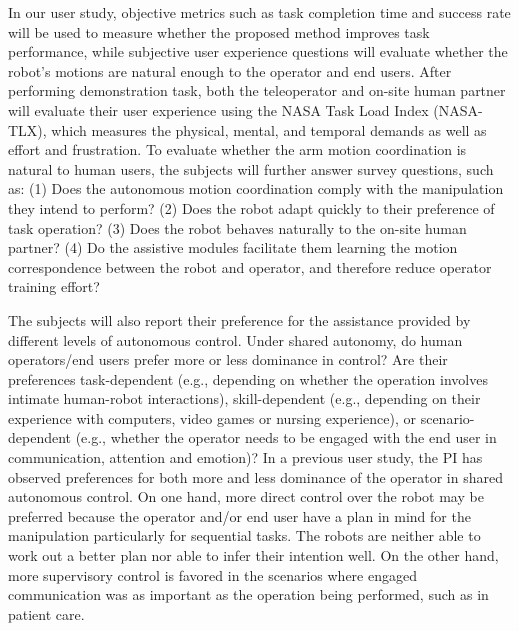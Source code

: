 \documentclass[letterpaper, 11 pt, onecolumn]{article}
\begin{document}
In our user study, objective metrics such as task completion time and success rate will be used to measure whether the proposed method improves task performance, while subjective user experience questions will evaluate whether the robot's motions are natural enough to the operator and end users. After performing demonstration task, both the teleoperator and on-site human partner will evaluate their user experience using the NASA Task Load Index (NASA-TLX), which measures the physical, mental, and temporal demands as well as effort and frustration. To evaluate whether the arm motion coordination is natural to human users, the subjects will further answer survey questions, such as: (1) Does the autonomous motion coordination comply with the manipulation they intend to perform? (2) Does the robot adapt quickly to their preference of task operation? (3) Does the robot behaves naturally to the on-site human partner? (4) Do the assistive modules facilitate them learning the motion correspondence between the robot and operator, and therefore reduce operator training effort? 

The subjects will also report their preference for the assistance provided by different levels of autonomous control. Under shared autonomy, do human operators/end users prefer more or less dominance in control? Are their preferences task-dependent (e.g., depending on whether the operation involves intimate human-robot interactions), skill-dependent (e.g., depending on their experience with computers, video games or nursing experience), or scenario-dependent (e.g., whether the operator needs to be engaged with the end user in communication, attention and emotion)? In a previous user study, the PI has observed preferences for both more and less dominance of the operator in shared autonomous control. On one hand, more direct control over the robot may be preferred because the operator and/or end user have a plan in mind for the manipulation particularly for sequential tasks. The robots are neither able to work out a better plan nor able to infer their intention well. On the other hand, more supervisory control is favored in the scenarios where engaged communication was as important as the operation being performed, such as in patient care. 


\end{document}
